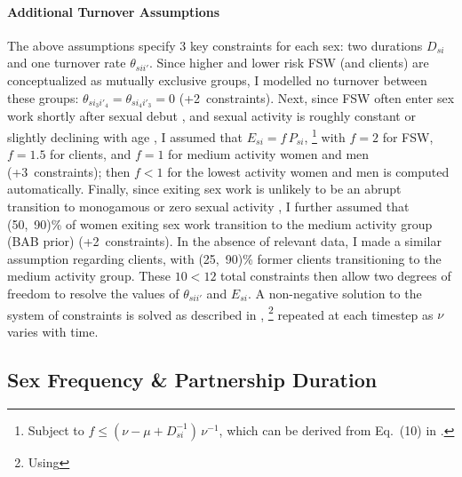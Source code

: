 \paragraph{Additional Turnover Assumptions}
The above assumptions specify 3 key constraints for each sex:
two durations $D_{si}$ and one turnover rate $\theta_{sii'}$.
Since higher and lower risk FSW (and clients) are conceptualized as mutually exclusive groups,
I modelled no turnover between these groups:
$\theta_{si_{3}i'_{4}} = \theta_{si_{4}i'_{3}} = 0$ (+2~constraints).
Next, since FSW often enter sex work shortly after sexual debut \cite{Cheuk2020,Ma2020},
and sexual activity is roughly constant or slightly declining with age \cite{Todd2009},
I assumed that $E_{si} = f\,P_{si}$,%
\footnote{Subject to $f \le (\nu - \mu + D_{si}^{-1})\,\nu^{-1}$,
  which can be derived from Eq.~(10) in \cite{Knight2020}.}
with $f = 2$ for FSW, $f = 1.5$ for clients,
and $f = 1$ for medium activity women and men (+3~constraints);
then $f < 1$ for the lowest activity women and men is computed automatically.
Finally, since exiting sex work is unlikely to be
an abrupt transition to monogamous or zero sexual activity \cite{Scorgie2012,Learmonth2015},
I further assumed that (50,~90)\% of women exiting sex work
transition to the medium activity group (BAB prior) (+2~constraints).
In the absence of relevant data, I made a similar assumption regarding clients,
with (25,~90)\% former clients transitioning to the medium activity group.
These $10 < 12$ total constraints then allow two degrees of freedom to resolve
the values of $\theta_{sii'}$ and $E_{si}$.
A non-negative solution to the system of constraints is solved as described in \cite{Knight2020},%
\footnote{Using }
repeated at each timestep as $\nu$ varies with time.
\subsection{Sex Frequency \& Partnership Duration}\label{model.par.sex}
